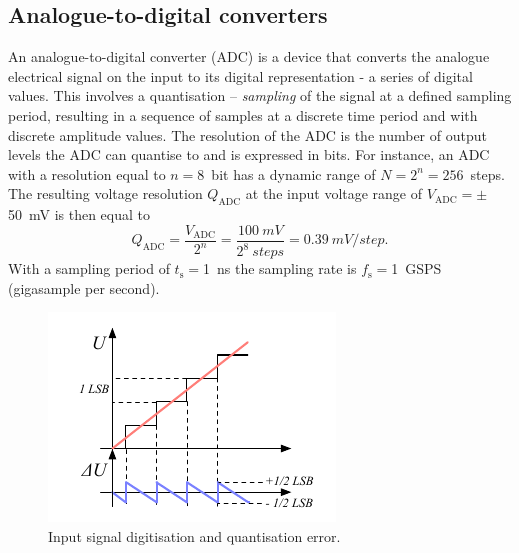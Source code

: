 \subsection{Analogue-to-digital converters}
An analogue-to-digital converter (ADC) is a device that converts the analogue electrical signal on the input to its digital representation - a series of digital values. This involves a quantisation -- \emph{sampling} of the signal at a defined sampling period, resulting in a sequence of samples at a discrete time period and with discrete amplitude values. The resolution of the ADC is the number of output levels the ADC can quantise to and is expressed in bits. For instance, an ADC with a resolution equal to $n=8$~bit  has a dynamic range of $N=2^n=256$~steps. The resulting voltage resolution $Q_\mathrm{ADC}$ at the input voltage range of $V_\mathrm{ADC}=\pm$50~mV is then equal to 
\begin{equation}
\label{eq:mvpercnt}
Q_\mathrm{ADC}=\frac{V_\mathrm{ADC}}{2^{n}}  = \frac{100~mV}{2^8~steps} = 0.39~mV/step.
\end{equation} 
With a sampling period of $t_\mathrm{s}=$1~ns the sampling rate is $f_\mathrm{s}=$1~GSPS (gigasample per second).
\begin{figure}[!t]
\begin{center}
\includegraphics[width=0.7\linewidth]{02_pulse_formation/pics/plots/qerr}
\caption{Input signal digitisation and quantisation error.}
\label{fig:qerr}
\end{center}
\end{figure}

